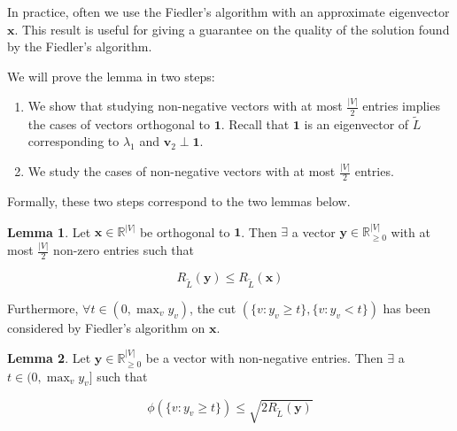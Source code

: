 \documentclass[a4paper]{article}
\theoremstyle{definition}
\newtheorem{lemma}{Lemma}[section]
\begin{document}
In practice, often we use the Fiedler's algorithm with an approximate eigenvector $\textbf{x}$. This result is useful for giving a guarantee on the quality of the solution found by the Fiedler's algorithm.

We will prove the lemma in two steps:
\begin{enumerate}
    \item We show that studying non-negative vectors with at most $\frac{|V|}{2}$ entries implies the cases of vectors orthogonal to $\textbf{1}$. Recall that $\textbf{1}$ is an eigenvector of $\tilde{L}$ corresponding to $\lambda_1$ and $\textbf{v}_2\perp\textbf{1}$.
    \item We study the cases of non-negative vectors with at most $\frac{|V|}{2}$ entries.
\end{enumerate}

Formally, these two steps correspond to the two lemmas below.

\begin{lemma}
\label{lemma:relation_to_nonnegative}
Let $\textbf{x}\in\mathbb{R}^{|V|}$ be orthogonal to $\textbf{1}$. Then $\exists$ a vector $\textbf{y}\in\mathbb{R}_{\geq 0}^{|V|}$ with at most $\frac{|V|}{2}$ non-zero entries such that

\begin{equation}
    R_{\tilde{L}}(\textbf{y}) \leq R_{\tilde{L}}(\textbf{x})
\end{equation}

Furthermore, $\forall t\in (0, \max_v y_v)$, the cut $(\{v:y_v\geq t\}, \{v:y_v<t\})$ has been considered by Fiedler's algorithm on $\textbf{x}$.
\end{lemma}

\begin{lemma}
\label{lemma:study_nonnegative}
Let $\textbf{y}\in\mathbb{R}_{\geq 0}^{|V|}$ be a vector with non-negative entries. Then $\exists$ a $t\in(0, \max_{v}y_v]$ such that

\begin{equation}
    \phi(\{v:y_v\geq t\}) \leq \sqrt{2R_{\tilde{L}}(\textbf{y})}
\end{equation}
\end{lemma}
\end{document}
